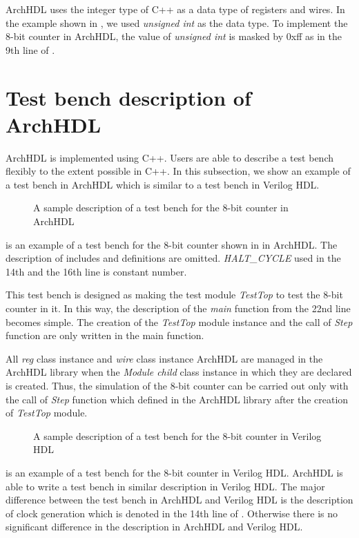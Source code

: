 ArchHDL uses the integer type of C++ as a data type of registers and wires.
In the example shown in , we used \textit{unsigned int} as the data type.
To implement the 8-bit counter in ArchHDL, the value of \textit{unsigned int} is masked by 0xff as in the 9th line of .

\section{Test bench description of ArchHDL}

ArchHDL is implemented using C++.
Users are able to describe a test bench flexibly to the extent possible in C++.
In this subsection, we show an example of a test bench in ArchHDL which is similar to a test bench in Verilog HDL.

\begin{figure}[t]
 
 \caption{A sample description of a test bench for the 8-bit counter in ArchHDL}
 \label{src:test}
\end{figure}

 is an example of a test bench for the 8-bit counter shown in  in ArchHDL.
The description of includes and definitions are omitted.
\textit{HALT\_CYCLE} used in the 14th and the 16th line is constant number.

This test bench is designed as making the test module \textit{TestTop} to test the 8-bit counter in it.
In this way, the description of the \textit{main} function from the 22nd line becomes simple.
The creation of the \textit{TestTop} module instance and the call of \textit{Step} function are only written in the main function.

All \textit{reg} class instance and \textit{wire} class instance ArchHDL are managed in the ArchHDL library when the \textit{Module child} class instance in which they are declared is created.
Thus, the simulation of the 8-bit counter can be carried out only with the call of \textit{Step} function which defined in the ArchHDL library after the creation of \textit{TestTop} module.

\begin{figure}[t]
 
 \caption{A sample description of a test bench for the 8-bit counter in Verilog HDL}
 \label{src:test_v}
\end{figure}

 is an example of a test bench for the 8-bit counter in Verilog HDL.
ArchHDL is able to write a test bench in similar description in Verilog HDL.
The major difference between the test bench in ArchHDL and Verilog HDL is the description of clock generation which is denoted in the 14th line of .
Otherwise there is no significant difference in the description in ArchHDL and Verilog HDL.

